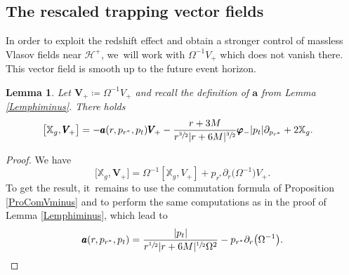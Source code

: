 \documentclass[10pt]{amsart}
\theoremstyle{plain}
\newtheorem{lemma}[proposition]{Lemma}
\theoremstyle{definition}
\newcommand\T{{\mathbb{X}}}
\renewcommand\H{{\mathcal{H}^+}}
\begin{document}
\subsection{The rescaled trapping vector fields}

In order to exploit the redshift effect and obtain a stronger control of massless Vlasov fields near $\H$, we~will work with $\Omega^{-1}V_+$ which does not vanish there. This vector field is smooth up to the future event horizon.

\begin{lemma}\label{LemComVminusregularised}
Let $\pmb{V}_{\! +}\coloneqq\Omega^{-1}V_+$ and recall the definition of $\pmb{a}$ from Lemma \ref{Lemphiminus}. There holds
\begin{align*}
\bigl[\T_g,\pmb{V}_{\! +}\bigr] &= - \pmb{a}(r,p_{r^*},p_t) \pmb{V}_{\! +}- \frac{r+3M}{r^{\sfrac{3}{2}}|r+6M|^{\sfrac{3}{2}}}\pmb{\varphi}_- |p_t|\partial_{p_{r^*}} + 2 \T_g.
\end{align*}
\end{lemma}
\begin{proof}
We have
\[
\bigl[\T_g,\pmb{V}_{\! +}\bigr]= \Omega^{-1}[\T_g,V_+]+p_{r^*} \partial_r \bigl(\Omega^{-1} \bigr) V_+.
\]
To get the result, it~remains to use the commutation formula of Proposition \ref{ProComVminus} and to perform the same computations as in the proof of Lemma \ref{Lemphiminus}, which lead to
\begin{equation}\label{eq:idbarbolda}
\pmb{a}(r,p_{r^*},p_t)= \frac{|p_t|}{r^{\sfrac{1}{2}}|r+6M|^{\sfrac{1}{2}}\Omega^2} -p_{r^*} \partial_r \bigl(\Omega^{-1} \bigr).\qedhere
\end{equation}
\end{proof}
\end{document}
